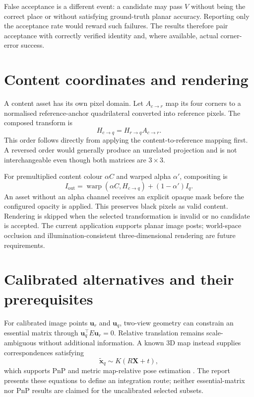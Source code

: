 False acceptance is a different event: a candidate may pass $V$ without being the correct place or without satisfying ground-truth planar accuracy. Reporting only the acceptance rate would reward such failures. The results therefore pair acceptance with correctly verified identity and, where available, actual corner-error success.

\section{Content coordinates and rendering}
A content asset has its own pixel domain. Let $A_{c\rightarrow r}$ map its four corners to a normalised reference-anchor quadrilateral converted into reference pixels. The composed transform is
\begin{equation}
 H_{c\rightarrow q}=H_{r\rightarrow q}A_{c\rightarrow r}.
\end{equation}
This order follows directly from applying the content-to-reference mapping first. A reversed order would generally produce an unrelated projection and is not interchangeable even though both matrices are $3\times3$.

For premultiplied content colour $\alpha C$ and warped alpha $\alpha'$, compositing is
\begin{equation}
 I_{\mathrm{out}}=\operatorname{warp}(\alpha C,H_{c\rightarrow q})+
 (1-\alpha')I_q.
\end{equation}
An asset without an alpha channel receives an explicit opaque mask before the configured opacity is applied. This preserves black pixels as valid content. Rendering is skipped when the selected transformation is invalid or no candidate is accepted. The current application supports planar image posts; world-space occlusion and illumination-consistent three-dimensional rendering are future requirements.

\ifFullReport
\section{Calibrated alternatives and their prerequisites}
For calibrated image points $\mathbf u_r$ and $\mathbf u_q$, two-view geometry can constrain an essential matrix through $\mathbf u_q^\top E\mathbf u_r=0$. Relative translation remains scale-ambiguous without additional information. A known 3D map instead supplies correspondences satisfying
\begin{equation}
 \widetilde{\mathbf x}_q\sim K(R\mathbf X+t),
\end{equation}
which supports PnP and metric map-relative pose estimation \citep{lepetit2009}. The report presents these equations to define an integration route; neither essential-matrix nor PnP results are claimed for the uncalibrated selected subsets.

